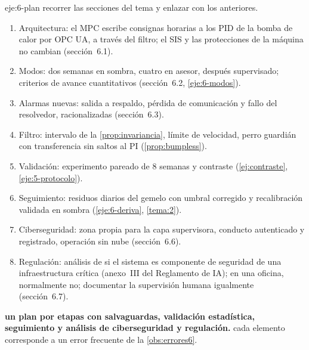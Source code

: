 \begin{solucion}{eje:6-plan}
\planteamiento recorrer las secciones del tema y enlazar con los anteriores.
\pasos
\begin{enumerate}[label=\arabic*.]
  \item Arquitectura: el MPC escribe consignas horarias a los PID de la bomba de calor por OPC UA, a través del filtro; el SIS y las protecciones de la máquina no cambian (sección~6.1).
  \item Modos: dos semanas en sombra, cuatro en asesor, después supervisado; criterios de avance cuantitativos (sección~6.2, \cref{eje:6-modos}).
  \item Alarmas nuevas: salida a respaldo, pérdida de comunicación y fallo del resolvedor, racionalizadas (sección~6.3).
  \item Filtro: intervalo de la \cref{prop:invariancia}, límite de velocidad, perro guardián con transferencia sin saltos al PI (\cref{prop:bumpless}).
  \item Validación: experimento pareado de 8 semanas y contraste (\cref{ej:contraste}, \cref{eje:5-protocolo}).
  \item Seguimiento: residuos diarios del gemelo con umbral corregido y recalibración validada en sombra (\cref{eje:6-deriva}, \cref{tema:2}).
  \item Ciberseguridad: zona propia para la capa supervisora, conducto autenticado y registrado, operación sin nube (sección~6.6).
  \item Regulación: análisis de si el sistema es componente de seguridad de una infraestructura crítica (anexo~III del Reglamento de IA); en una oficina, normalmente no; documentar la supervisión humana igualmente (sección~6.7).
\end{enumerate}
\resultado \textbf{un plan por etapas con salvaguardas, validación estadística, seguimiento y análisis de ciberseguridad y regulación.}
\comprobacion cada elemento corresponde a un error frecuente de la \cref{obs:errores6}.
\end{solucion}
